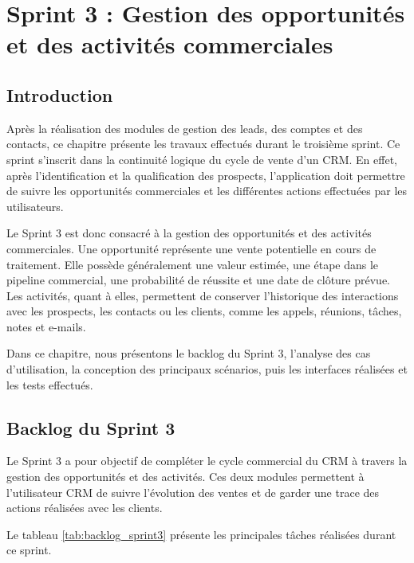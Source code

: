 \documentclass[12pt,a4paper,twoside,openany]{book}
\begin{document}
\chapter{Sprint 3 : Gestion des opportunités et des activités commerciales}

\section*{Introduction}

Après la réalisation des modules de gestion des leads, des comptes et des contacts, ce chapitre présente les travaux effectués durant le troisième sprint. Ce sprint s’inscrit dans la continuité logique du cycle de vente d’un CRM. En effet, après l’identification et la qualification des prospects, l’application doit permettre de suivre les opportunités commerciales et les différentes actions effectuées par les utilisateurs.

Le Sprint 3 est donc consacré à la gestion des opportunités et des activités commerciales. Une opportunité représente une vente potentielle en cours de traitement. Elle possède généralement une valeur estimée, une étape dans le pipeline commercial, une probabilité de réussite et une date de clôture prévue. Les activités, quant à elles, permettent de conserver l’historique des interactions avec les prospects, les contacts ou les clients, comme les appels, réunions, tâches, notes et e-mails.

Dans ce chapitre, nous présentons le backlog du Sprint 3, l’analyse des cas d’utilisation, la conception des principaux scénarios, puis les interfaces réalisées et les tests effectués.

\section{Backlog du Sprint 3}

Le Sprint 3 a pour objectif de compléter le cycle commercial du CRM à travers la gestion des opportunités et des activités. Ces deux modules permettent à l’utilisateur CRM de suivre l’évolution des ventes et de garder une trace des actions réalisées avec les clients.

Le tableau \ref{tab:backlog_sprint3} présente les principales tâches réalisées durant ce sprint.
\end{document}
